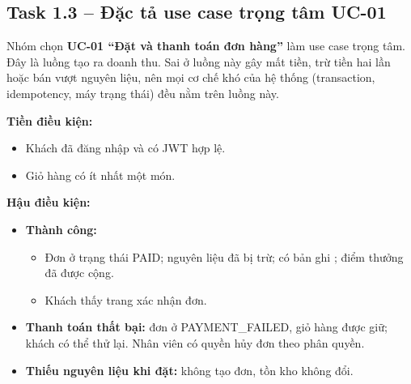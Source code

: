 
\subsection{Task 1.3 -- Đặc tả use case trọng tâm UC-01}
Nhóm chọn \textbf{UC-01 ``Đặt và thanh toán đơn hàng''} làm use case trọng tâm. Đây là luồng tạo ra doanh thu. Sai ở luồng này gây mất tiền, trừ tiền hai lần hoặc bán vượt nguyên liệu, nên mọi cơ chế khó của hệ thống (transaction, idempotency, máy trạng thái) đều nằm trên luồng này.




\textbf{Tiền điều kiện:}
\begin{itemize}
\item Khách đã đăng nhập và có JWT hợp lệ.
\item Giỏ hàng có ít nhất một món.
\end{itemize}

\textbf{Hậu điều kiện:}
\begin{itemize}
\item \textbf{Thành công:}
  \begin{itemize}
  \item Đơn ở trạng thái PAID; nguyên liệu đã bị trừ; có bản ghi ; điểm thưởng đã được cộng.
  \item Khách thấy trang xác nhận đơn.
  \end{itemize}
\item \textbf{Thanh toán thất bại:} đơn ở PAYMENT\_FAILED, giỏ hàng được giữ; khách có thể thử lại. Nhân viên có quyền hủy đơn theo phân quyền.
\item \textbf{Thiếu nguyên liệu khi đặt:} không tạo đơn, tồn kho không đổi.
\end{itemize}


